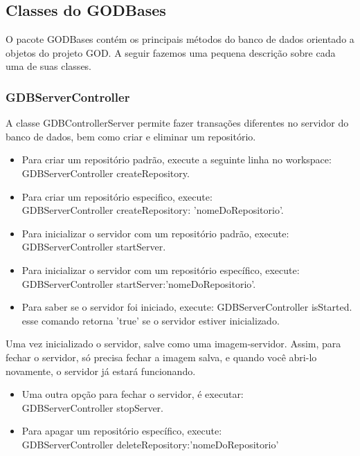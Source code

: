 \documentclass[a4paper, 10pt]{article}
\begin{document}
\begin{newpage}
\subsection{ Classes do GODBases}
O pacote GODBases contém os principais métodos do banco de dados orientado a objetos do projeto GOD. A seguir fazemos uma pequena descrição sobre cada uma de suas classes.


\subsubsection{GDBServerController}

A classe GDBControllerServer permite fazer transações diferentes no servidor do banco de dados, bem como criar e eliminar um repositório. 

\begin{itemize}
\item Para criar um repositório padrão, execute a seguinte linha no workspace:\\
 { GDBServerController createRepository.}
\item Para criar um repositório especifico, execute:\\
{GDBServerController createRepository: 'nomeDoRepositorio'.}
\item Para inicializar o servidor com um repositório padrão, execute:\\
{GDBServerController startServer.}
\item Para inicializar o servidor com um repositório específico, execute:\\
{GDBServerController startServer:'nomeDoRepositorio'.}
\item{Para saber se o servidor foi iniciado, execute:}
{GDBServerController isStarted.}\\
esse comando retorna 'true' se o servidor estiver inicializado.
\end{itemize}

Uma vez inicializado o servidor, salve como uma imagem-servidor. Assim, para fechar o servidor, só precisa fechar a imagem salva, e quando você abri-lo novamente, o servidor já estará funcionando.

\begin{itemize}
\item Uma outra opção para fechar o servidor, é executar:\\
{GDBServerController stopServer.}
\item Para apagar um repositório específico, execute:\\
{GDBServerController deleteRepository:'nomeDoRepositorio'}
\end{itemize}



\end{newpage}
\end{document}
